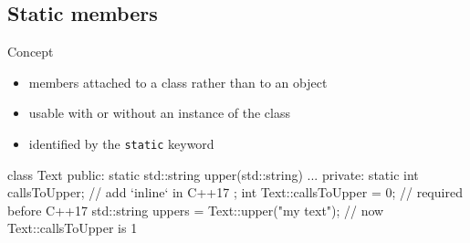 \subsection[static]{Static members}

\begin{frame}[fragile]
  \begin{block}{Concept}
    \begin{itemize}
    \item members attached to a class rather than to an object
    \item usable with or without an instance of the class
    \item identified by the \texttt{static} keyword
    \end{itemize}
  \end{block}
  \begin{cppcode}
    class Text {
    public:
      static std::string upper(std::string) {...}
    private:
      static int callsToUpper; // add `inline` in C++17
    };
    int Text::callsToUpper = 0; // required before C++17
    std::string uppers = Text::upper("my text");
    // now Text::callsToUpper is 1
  \end{cppcode}
\end{frame}

